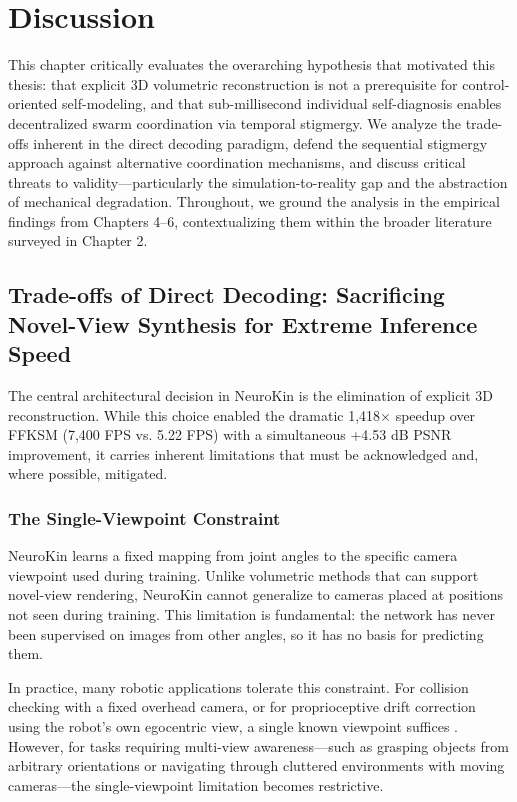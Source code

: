 ﻿\documentclass[12pt,a4paper,oneside]{report}
\begin{document}
\chapter{Discussion}

This chapter critically evaluates the overarching hypothesis that motivated this thesis: that explicit 3D volumetric reconstruction is not a prerequisite for control-oriented self-modeling, and that sub-millisecond individual self-diagnosis enables decentralized swarm coordination via temporal stigmergy. We analyze the trade-offs inherent in the direct decoding paradigm, defend the sequential stigmergy approach against alternative coordination mechanisms, and discuss critical threats to validity---particularly the simulation-to-reality gap and the abstraction of mechanical degradation. Throughout, we ground the analysis in the empirical findings from Chapters 4--6, contextualizing them within the broader literature surveyed in Chapter 2.

\section{Trade-offs of Direct Decoding: Sacrificing Novel-View Synthesis for Extreme Inference Speed}

The central architectural decision in NeuroKin is the elimination of explicit 3D reconstruction. While this choice enabled the dramatic 1,418$\times$ speedup over FFKSM (7,400 FPS vs. 5.22 FPS) with a simultaneous +4.53 dB PSNR improvement, it carries inherent limitations that must be acknowledged and, where possible, mitigated.

\subsection{The Single-Viewpoint Constraint}

NeuroKin learns a fixed mapping from joint angles to the specific camera viewpoint used during training. Unlike volumetric methods that can support novel-view rendering, NeuroKin cannot generalize to cameras placed at positions not seen during training. This limitation is fundamental: the network has never been supervised on images from other angles, so it has no basis for predicting them.

In practice, many robotic applications tolerate this constraint. For collision checking with a fixed overhead camera, or for proprioceptive drift correction using the robot's own egocentric view, a single known viewpoint suffices \cite{hu2024teaching, chen2022full}. However, for tasks requiring multi-view awareness---such as grasping objects from arbitrary orientations or navigating through cluttered environments with moving cameras---the single-viewpoint limitation becomes restrictive.
\end{document}
